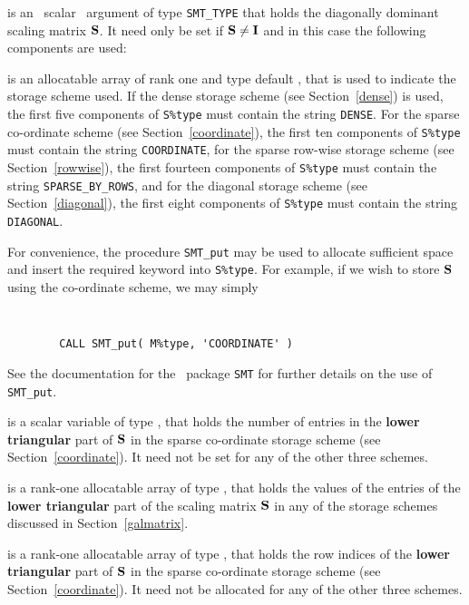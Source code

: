 \documentclass{galahad}
\begin{document}
\begin{description}
 is an \optional\ scalar \intentin\ argument of type {\tt SMT\_TYPE}
that holds the diagonally dominant scaling matrix ${\mathbf{S}}$. It need only be set
if ${\mathbf{S}} \neq {\mathbf{I}}$ and in this case the following components are used:

\begin{description}

 is an allocatable array of rank one and type default
\character, that
is used to indicate the storage scheme used. If the dense storage scheme
(see Section~\ref{dense}) is used,
the first five components of {\tt S\%type} must contain the
string {\tt DENSE}.
For the sparse co-ordinate scheme (see Section~\ref{coordinate}),
the first ten components of {\tt S\%type} must contain the
string {\tt COORDINATE},
for the sparse row-wise storage scheme (see Section~\ref{rowwise}),
the first fourteen components of {\tt S\%type} must contain the
string {\tt SPARSE\_BY\_ROWS},
and for the diagonal storage scheme (see Section~\ref{diagonal}),
the first eight components of {\tt S\%type} must contain the
string {\tt DIAGONAL}.

For convenience, the procedure {\tt SMT\_put}
may be used to allocate sufficient space and insert the required keyword
into {\tt S\%type}.
For example, if we wish to store ${\mathbf{S}}$ using the co-ordinate scheme,
we may simply
{\tt
\begin{verbatim}
        CALL SMT_put( M%type, 'COORDINATE' )
\end{verbatim}
}
\noindent
See the documentation for the \galahad\ package {\tt SMT}
for further details on the use of {\tt SMT\_put}.

 is a scalar variable of type \integer, that
holds the number of entries in the {\bf lower triangular} part of ${\mathbf{S}}$
in the sparse co-ordinate storage scheme (see Section~\ref{coordinate}).
It need not be set for any of the other three schemes.

 is a rank-one allocatable array of type \realdp, that holds
the values of the entries of the {\bf lower triangular} part
of the scaling matrix ${\mathbf{S}}$ in any of the
storage schemes discussed in Section~\ref{galmatrix}.

 is a rank-one allocatable array of type \integer,
that holds the row indices of the {\bf lower triangular} part of ${\mathbf{S}}$
in the sparse co-ordinate storage
scheme (see Section~\ref{coordinate}).
It need not be allocated for any of the other three schemes.


\end{description}
\end{description}
\end{document}
